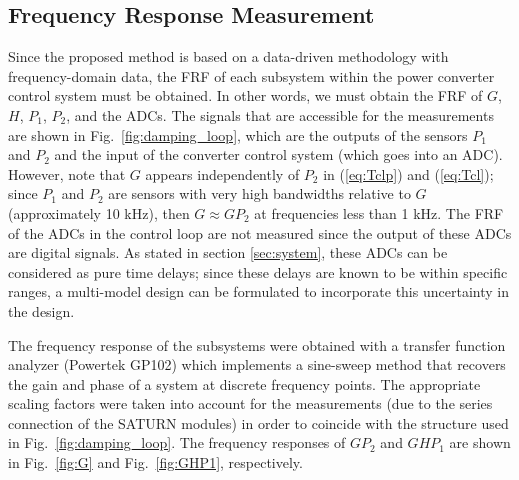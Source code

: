 \documentclass[a4paper, 10pt, conference]{ieeeconf}
\begin{document}

\subsection{Frequency Response Measurement}
Since the proposed method is based on a data-driven methodology with frequency-domain data, the FRF of each subsystem within the power converter control system must be obtained. In other words, we must obtain the FRF of $G$, $H$, $P_1$, $P_2$, and the ADCs. The signals that are accessible for the measurements are shown in Fig.~\ref{fig:damping_loop}, which are the outputs of the sensors $P_1$ and $P_2$ and the input of the converter control system (which goes into an ADC). However, note that $G$ appears independently of $P_2$ in (\ref{eq:Tclp}) and (\ref{eq:Tcl}); since $P_1$ and $P_2$ are sensors with very high bandwidths relative to $G$ (approximately 10 kHz), then $G \approx GP_2$  at frequencies less than 1 kHz. The FRF of the ADCs in the control loop are not measured since the output of these ADCs are digital signals. As stated in section \ref{sec:system}, these ADCs can be considered as pure time delays; since these delays are known to be within specific ranges, a multi-model design can be formulated to incorporate this uncertainty in the design. 

The frequency response of the subsystems were obtained with a transfer function analyzer (Powertek GP102) which implements a sine-sweep method that recovers the gain and phase of a system at discrete frequency points. The appropriate scaling factors were taken into account for the measurements (due to the series connection of the SATURN modules) in order to coincide with the structure used in Fig.~\ref{fig:damping_loop}. The frequency responses of $GP_2$ and $GHP_1$ are shown in Fig.~\ref{fig:G} and Fig.~\ref{fig:GHP1}, respectively.
\end{document}
